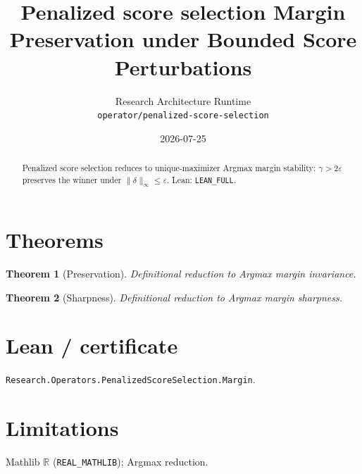 \documentclass[11pt]{article}
\title{Penalized score selection Margin Preservation under Bounded Score Perturbations}
\author{Research Architecture Runtime \\ \texttt{operator/penalized-score-selection}}
\date{2026-07-25}
\newtheorem{theorem}{Theorem}
\begin{document}
\maketitle
\begin{abstract}
Penalized score selection reduces to unique-maximizer Argmax margin stability: $\gamma>2\varepsilon$
preserves the winner under $\|\delta\|_\infty\le\varepsilon$. Lean: \texttt{LEAN\_FULL}.
\end{abstract}
\section{Theorems}
\begin{theorem}[Preservation]
Definitional reduction to Argmax margin invariance.
\end{theorem}
\begin{theorem}[Sharpness]
Definitional reduction to Argmax margin sharpness.
\end{theorem}
\section{Lean / certificate}
\texttt{Research.Operators.PenalizedScoreSelection.Margin}.
\section{Limitations}
Mathlib $\mathbb{R}$ (\texttt{REAL\_MATHLIB}); Argmax reduction.
\end{document}
